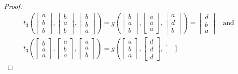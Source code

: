 \documentclass[11pt]{amsart}
\theoremstyle{definition}
\theoremstyle{remark}
\theoremstyle{plain}
\begin{document}
\begin{enumerate}[wide, labelindent=0pt]
\begin{enumerate}[wide, labelindent=0pt]
\begin{proof}
$$\begin{gathered}
t_3\left(
\begin{bmatrix}
a \\
b \\
b
\end{bmatrix}\!,\!
\begin{bmatrix}
b \\
a \\
b
\end{bmatrix}\!,\!
\begin{bmatrix}
b \\
b \\
a
\end{bmatrix}
\right)=
g\left(
\begin{bmatrix}
b \\
a \\
b
\end{bmatrix}\!,\!
\begin{bmatrix}
a \\
a \\
a
\end{bmatrix}\!,\!
\begin{bmatrix}
a \\
d \\
b
\end{bmatrix}
\right)=
\begin{bmatrix}
d \\
b \\
a
\end{bmatrix}\quad\text{and}\\
t_3\left(
\begin{bmatrix}
b \\
a \\
a
\end{bmatrix}\!,\!
\begin{bmatrix}
a \\
b \\
a
\end{bmatrix}\!,\!
\begin{bmatrix}
a \\
a \\
b
\end{bmatrix}
\right)=
g\left(
\begin{bmatrix}
a \\
b \\
a
\end{bmatrix}\!,\!
\begin{bmatrix}
d \\
d \\
d
\end{bmatrix}\!,\!
\begin{bmatrix}

\end{bmatrix}
\end{gathered}$$
\end{proof}
\end{enumerate}
\end{enumerate}
\end{document}
